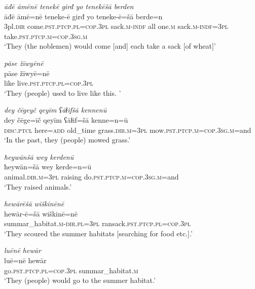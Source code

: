 \ea \label{RE.71}
\textit{āđē āmēnē tenekē girđ yo tenekēšā berden} \\ 
\gll āđē āmē=nē teneke-ē girđ yo teneke-ē=šā berde=n \\ 
 3pl\textsc{.dir} come\textsc{.pst}\textsc{.ptcp}\textsc{.pl}\textsc{=cop}\textsc{.3pl} sack\textsc{.m}\textsc{-indf} all one\textsc{.m} sack\textsc{.m}\textsc{-indf}\textsc{=3pl} take\textsc{.pst}\textsc{.ptcp}\textsc{.m}\textsc{=cop}\textsc{.3sg}\textsc{.m} \\ 
\glt `They (the noblemen) would come [and] each take a sack [of wheat]'
\z 
 
\ea \label{RE.72}
\textit{pāse žīwyēnē} \\ 
\gll pāse žīwyē=nē \\ 
 like live\textsc{.pst}\textsc{.ptcp}\textsc{.pl}\textsc{=cop}\textsc{.3pl} \\ 
\glt `They (people) used to live like this. '
\z 
 
 


\ea \label{ŽE.1}
\textit{dey čēgeyč qeyīm ʕāɫifšā kennenū} \\ 
\gll dey čēge=īč qeyīm ʕāɫif=šā kenne=n=ū \\ 
 \textsc{disc.ptcl} here\textsc{=add} old\_time grass\textsc{.dir}\textsc{.m}\textsc{=3pl} mow\textsc{.pst}\textsc{.ptcp}\textsc{.m}\textsc{=cop}\textsc{.3sg}\textsc{.m}=and \\ 
\glt `In the past, they (people) mowed grass.'
\z 
 
\ea \label{ŽE.2}
\textit{ħeywānšā wey kerdenū} \\ 
\gll ħeywān=šā wey kerde=n=ū \\ 
 animal\textsc{.dir}\textsc{.m}\textsc{=3pl} raising do\textsc{.pst}\textsc{.ptcp}\textsc{.m}\textsc{=cop}\textsc{.3sg}\textsc{.m}=and \\ 
\glt `They raised animals.'
\z 
 
\ea \label{ŽE.3}
\textit{hewārēšā wiškinēnē} \\ 
\gll hewār-ē=šā wiškinē=nē \\ 
 summar\_habitat\textsc{.m}\textsc{-dir}\textsc{.pl}\textsc{=3pl} ransack\textsc{.pst}\textsc{.ptcp}\textsc{.pl}\textsc{=cop}\textsc{.3pl} \\ 
\glt `They scoured the summer habitats [searching for food etc.].'
\z 
 
\ea \label{ŽE.8}
\textit{luēnē hewār} \\ 
\gll luē=nē hewār \\ 
 go\textsc{.pst}\textsc{.ptcp}\textsc{.pl}\textsc{=cop}\textsc{.3pl} summar\_habitat\textsc{.m} \\ 
\glt `They (people) would go to the summer habitat.'
\z 
 
